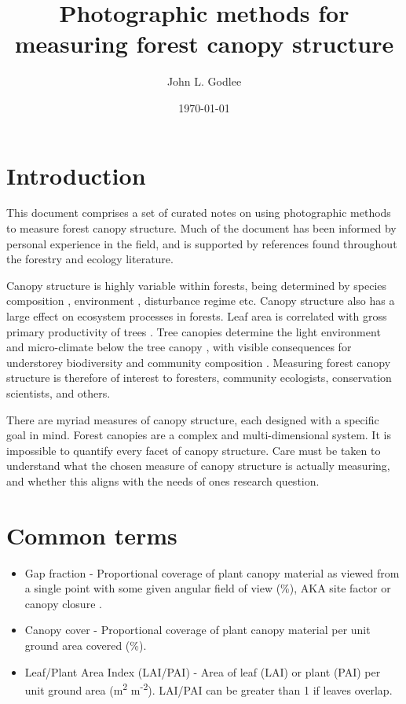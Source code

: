 \documentclass[11pt,a4paper]{article}
\title{Photographic methods for measuring forest canopy structure}
\date{\today}
\author{John L. Godlee}
\begin{document}
\maketitle

\tableofcontents
\newpage

\section{Introduction}

This document comprises a set of curated notes on using photographic methods to measure forest canopy structure. Much of the document has been informed by personal experience in the field, and is supported by references found throughout the forestry and ecology literature. 

Canopy structure is highly variable within forests, being determined by species composition \citep{}, environment \citep{}, disturbance regime \citep{} etc. Canopy structure also has a large effect on ecosystem processes in forests. Leaf area is correlated with gross primary productivity of trees \citep{}. Tree canopies determine the light environment and micro-climate below the tree canopy \citep{}, with visible consequences for understorey biodiversity and community composition \citep{}. Measuring forest canopy structure is therefore of interest to foresters, community ecologists, conservation scientists, and others.

There are myriad measures of canopy structure, each designed with a specific goal in mind. Forest canopies are a complex and multi-dimensional system. It is impossible to quantify every facet of canopy structure. Care must be taken to understand what the chosen measure of canopy structure is actually measuring, and whether this aligns with the needs of ones research question.

\section{Common terms}

\begin{itemize}
	\item{Gap fraction - Proportional coverage of plant canopy material as viewed from a single point with some given angular field of view (\%), AKA site factor or canopy closure \citep{Anderson1964}.}
	\item{Canopy cover - Proportional coverage of plant canopy material per unit ground area covered (\%).}
	\item{Leaf/Plant Area Index (LAI/PAI) - Area of leaf (LAI) or plant (PAI) per unit ground area (m\textsuperscript{2} m\textsuperscript{-2}). LAI/PAI can be greater than 1 if leaves overlap.}
\end{itemize}
\end{document}
